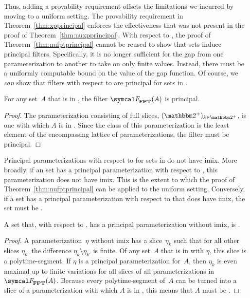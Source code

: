 Thus, adding a provability requirement offsets the limitations we incurred by moving to a uniform setting.
The provability requirement in Theorem~\ref{thm:xpprincipal} enforces the effectiveness that was not present in the proof of Theorem~\ref{thm:nuxpprincipal}.
With respect to , the proof of Theorem~\ref{thm:nufptprincipal} cannot be reused to show that  sets induce principal filters.
Specifically, it is no longer sufficient for the gap from one parameterization to another to take on only finite values.
Instead, there must be a uniformly computable bound on the value of the gap function.
Of course, we \emph{can} show that filters with respect to  are principal for sets in .
\begin{theorem}
\label{thm:fptprincipal}%
  For any set~$A$ that is in , the filter $\calF_\cl{FPT}(A)$ is principal.
\end{theorem}
\begin{proof}
  The parameterization consisting of full slices, $(\binary^+)_{k \in \binary^+}$, is one with which $A$ is in .
  Since the class of this parameterization is the least element of the encompassing lattice of parameterizations, the filter must be principal.
\end{proof}

%
%
Principal parameterizations with respect to  for sets in  do not have imix.
More broadly, if an  set has a principal parameterization with respect to , this parameterization does not have imix.
This is the extent to which the proof of Theorem~\ref{thm:nufptprincipal} can be applied to the uniform setting.
Conversely, if a set has a principal parameterization with respect to  that does have imix, the set must be .
\begin{lemma}
\label{lem:fptimix}%
  A set that, with respect to , has a principal parameterization without imix, is .
\end{lemma}
\begin{proof}
  A parameterization~$\eta$ without imix has a slice~$\eta_k$ such that for all other slices $\eta_{k'}$ the difference $\eta_k \setminus \eta_{k'}$ is finite.
  Of any set~$A$ that is in  with $\eta$, this slice is a polytime-segment.
  If $\eta$ is a principal parameterization for~$A$, then $\eta_k$ is even maximal up to finite variations for all slices of all parameterizations in~$\calF_\cl{FPT}(A)$.
  Because every polytime-segment of~$A$ can be turned into a slice of a parameterization with which $A$ is in , this means that $A$ must be .
\end{proof}
%

